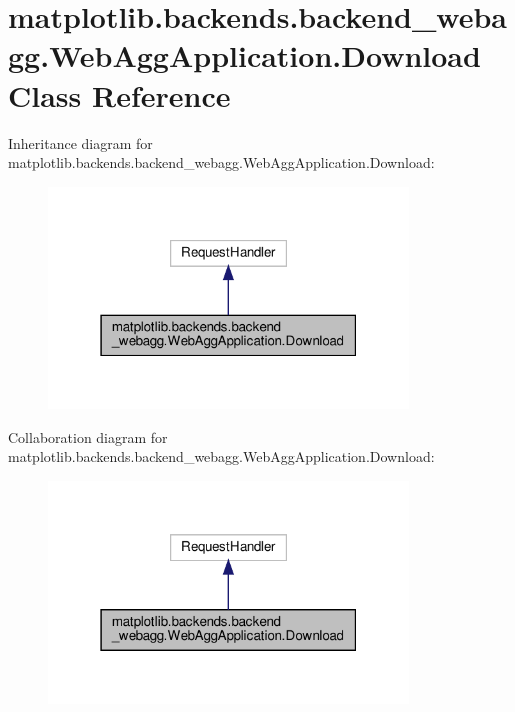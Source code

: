 \hypertarget{classmatplotlib_1_1backends_1_1backend__webagg_1_1WebAggApplication_1_1Download}{}\section{matplotlib.\+backends.\+backend\+\_\+webagg.\+Web\+Agg\+Application.\+Download Class Reference}
\label{classmatplotlib_1_1backends_1_1backend__webagg_1_1WebAggApplication_1_1Download}


Inheritance diagram for matplotlib.\+backends.\+backend\+\_\+webagg.\+Web\+Agg\+Application.\+Download\+:
\nopagebreak
\begin{figure}[H]
\begin{center}
\leavevmode
\includegraphics[width=271pt]{classmatplotlib_1_1backends_1_1backend__webagg_1_1WebAggApplication_1_1Download__inherit__graph}
\end{center}
\end{figure}


Collaboration diagram for matplotlib.\+backends.\+backend\+\_\+webagg.\+Web\+Agg\+Application.\+Download\+:
\nopagebreak
\begin{figure}[H]
\begin{center}
\leavevmode
\includegraphics[width=271pt]{classmatplotlib_1_1backends_1_1backend__webagg_1_1WebAggApplication_1_1Download__coll__graph}
\end{center}
\end{figure}
